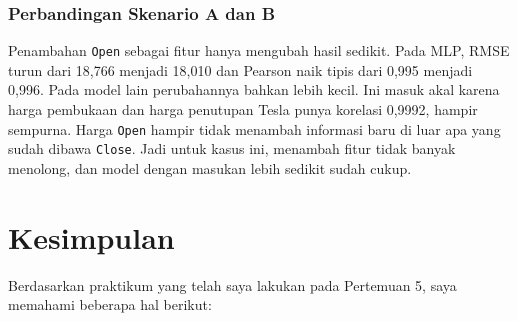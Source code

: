 \documentclass[a4paper,oneside,12pt]{report}
\begin{document}
\subsection{Perbandingan Skenario A dan B}
Penambahan \texttt{Open} sebagai fitur hanya mengubah hasil sedikit. Pada MLP, RMSE turun dari 18,766 menjadi 18,010 dan Pearson naik tipis dari 0,995 menjadi 0,996. Pada model lain perubahannya bahkan lebih kecil. Ini masuk akal karena harga pembukaan dan harga penutupan Tesla punya korelasi 0,9992, hampir sempurna. Harga \texttt{Open} hampir tidak menambah informasi baru di luar apa yang sudah dibawa \texttt{Close}. Jadi untuk kasus ini, menambah fitur tidak banyak menolong, dan model dengan masukan lebih sedikit sudah cukup.

\clearpage

\chapter{Kesimpulan}
Berdasarkan praktikum yang telah saya lakukan pada Pertemuan 5, saya memahami beberapa hal berikut:
\end{document}
